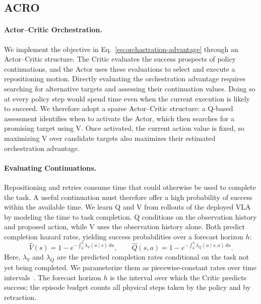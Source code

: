 \subsection{ACRO}
\label{sec:acro}
\paragraph{Actor--Critic Orchestration.}
We implement the objective in Eq.~\ref{eq:orchastration-advantage}
through an Actor--Critic structure. The Critic evaluates the
success prospects of policy continuations, and the Actor uses
these evaluations to select and execute a repositioning motion.
Directly evaluating the orchestration advantage requires searching
for alternative targets and assessing their continuation values.
Doing so at every policy step would spend time even when the
current execution is likely to succeed. We therefore adopt a
sparse Actor--Critic structure: a Q-based assessment identifies
when to activate the Actor, which then searches for a promising
target using V. Once activated, the current action value is fixed,
so maximizing V over candidate targets also maximizes their
estimated orchestration advantage.

\paragraph{Evaluating Continuations.}
Repositioning and retries consume time that could otherwise be
used to complete the task. A useful continuation must therefore
offer a high probability of success within the available time.
We learn Q and V from rollouts of the deployed VLA by modeling
the time to task completion. Q conditions on the observation
history and proposed action, while V uses the observation history
alone. Both predict completion hazard rates, yielding success
probabilities over a forecast horizon $h$:
\begin{equation}
\widehat V(s)=1-e^{-\int_0^h\lambda_V(u\mid s)\,du},
\qquad
\widehat Q(s,a)=1-e^{-\int_0^h\lambda_Q(u\mid s,a)\,du}.
\label{eq:time-to-success-values}
\end{equation}
Here, $\lambda_V$ and $\lambda_Q$ are the predicted completion
rates conditional on the task not yet being completed. We
parameterize them as piecewise-constant rates over time intervals~\citep{kvamme2021survival}.
The forecast horizon $h$ is the interval over which the Critic predicts success; the episode budget counts all physical steps taken by the policy and by retraction.

